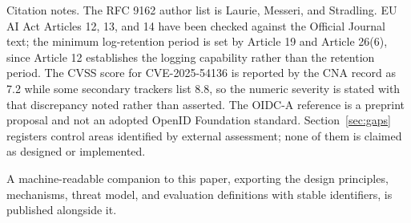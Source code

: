 \documentclass[11pt,letterpaper]{article}
\begin{document}
Citation notes. The RFC 9162 author list is Laurie, Messeri, and Stradling. EU AI Act Articles 12, 13, and 14 have been checked against the Official Journal text; the minimum log-retention period is set by Article 19 and Article 26(6), since Article 12 establishes the logging capability rather than the retention period. The CVSS score for CVE-2025-54136 is reported by the CNA record as 7.2 while some secondary trackers list 8.8, so the numeric severity is stated with that discrepancy noted rather than asserted. The OIDC-A reference is a preprint proposal and not an adopted OpenID Foundation standard. Section~\ref{sec:gaps} registers control areas identified by external assessment; none of them is claimed as designed or implemented.

A machine-readable companion to this paper, exporting the design principles, mechanisms, threat model, and evaluation definitions with stable identifiers, is published alongside it.
\end{document}
